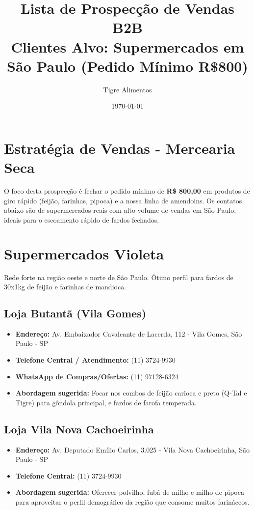 \documentclass[12pt,a4paper]{article}
\title{\textbf{Lista de Prospecção de Vendas B2B}\\
\large Clientes Alvo: Supermercados em São Paulo (Pedido Mínimo R\$800)}
\author{Tigre Alimentos}
\date{\today}
\begin{document}
\maketitle

\section*{Estratégia de Vendas - Mercearia Seca}
O foco desta prospecção é fechar o pedido mínimo de \textbf{R\$ 800,00} em produtos de giro rápido (feijão, farinhas, pipoca) e a nossa linha de amendoins. Os contatos abaixo são de supermercados reais com alto volume de vendas em São Paulo, ideais para o escoamento rápido de fardos fechados.

\vspace{1cm}

\section{Supermercados Violeta}
Rede forte na região oeste e norte de São Paulo. Ótimo perfil para fardos de 30x1kg de feijão e farinhas de mandioca.

\subsection*{Loja Butantã (Vila Gomes)}
\begin{itemize}
    \item \textbf{Endereço:} Av. Embaixador Cavalcante de Lacerda, 112 - Vila Gomes, São Paulo - SP
    \item \textbf{Telefone Central / Atendimento:} (11) 3724-9930
    \item \textbf{WhatsApp de Compras/Ofertas:} (11) 97128-6324
    \item \textbf{Abordagem sugerida:} Focar nos combos de feijão carioca e preto (Q-Tal e Tigre) para gôndola principal, e fardos de farofa temperada.
\end{itemize}

\subsection*{Loja Vila Nova Cachoeirinha}
\begin{itemize}
    \item \textbf{Endereço:} Av. Deputado Emílio Carlos, 3.025 - Vila Nova Cachoeirinha, São Paulo - SP
    \item \textbf{Telefone Central:} (11) 3724-9930
    \item \textbf{Abordagem sugerida:} Oferecer polvilho, fubá de milho e milho de pipoca para aproveitar o perfil demográfico da região que consome muitos farináceos.
\end{itemize}
\end{document}
